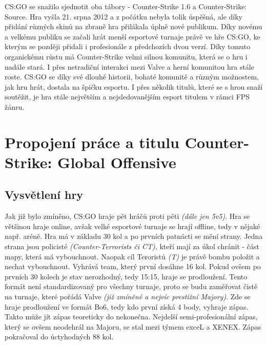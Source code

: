 \ac{CS:GO} se snažilo sjednotit oba tábory - Counter-Strike 1.6 a Counter-Strike: Source. Hra vyšla 21. srpna 2012 a z počátku nebyla tolik úspěšná, ale díky přidání různých skinů\cite{Valve2013} na zbraně hra přilákala
úplně nové publikum. Díky novému a velkému publiku se začali hrát menší esportové turnaje právě ve hře \ac{CS:GO}, ke kterým se později přidali i profesionále z předchozích dvou verzí. Díky tomuto organickému růstu má
Counter-Strike velmi silnou komunitu, která se o hru i nadále stará. I přes netradiční interakci mezi Valve a herní komunitou hra stále roste. \ac{CS:GO} se díky své dlouhé historii, bohaté komunitě a různým možnostem,
jak hru hrát, dostala na špičku esportu. I přes několik titulů, které se s hrou snaží soutěžit, je hra stále největším a nejsledovanějším esport titulem v rámci \ac{FPS} žánru\cite{Henningson2020}.

\section{Propojení práce a titulu Counter-Strike: Global Offensive}
\subsection{Vysvětlení hry}
Jak již bylo zmíněno, \ac{CS:GO} hraje pět hráčů proti pěti \textit{(dále jen 5v5)}. Hra se většinou hraje online, avšak velké esportové turnaje se hrají offline, tedy v nějaké např. aréně. Hra má v základu 30 kol a po 
prvních patnácti se mění strany. Jedna strana jsou policisté \textit{(Counter-Terrorists či CT)}, kteří mají za úkol chránit  - část mapy, která má vybouchnout. Naopak cíl Teroristů \textit{(T)} je právě
bombu položit a  nechat vybouchnout. Vyhrává team, který první dosáhne 16 kol. Pokud ovšem po prvních 30 kolech je stav nerozhodný, tedy 15:15, hraje se prodloužení. Tento formát není standardizovaný pro
všechny turnaje, proto se budu zaměřovat čistě na turnaje, které pořádá Valve \textit{(již zmíněné a nejvíc prestižní Majory)}. Zde se hraje prodloužení ve formát Bo6, tedy kdo první získá 4 body, vyhraje zápas. Takto 
může jít zápas teoreticky do nekonečna. Nejdelší semi-profesionální zápas, který se ovšem neodehrál na Majoru, se stal mezi týmem exceL a XENEX\cite{hltv.org2015}. Zápas pokračoval do úctyhodných 88 kol.

